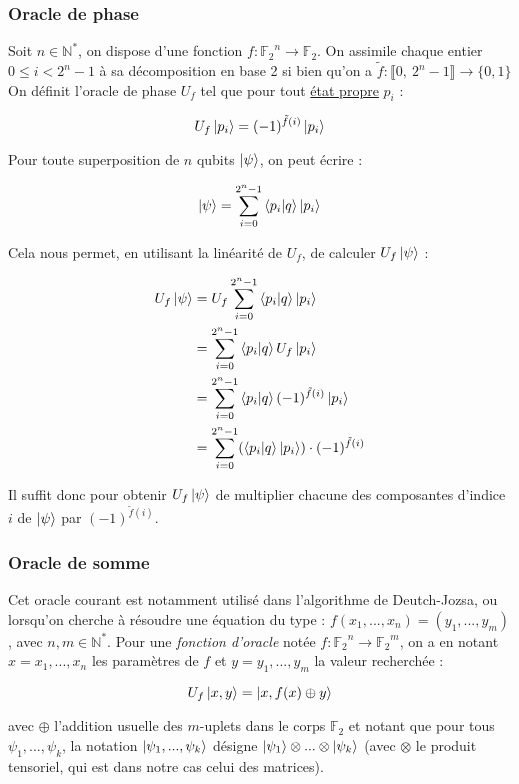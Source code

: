 \documentclass[french]{article}
\newcommand{\somme}{\displaystyle\sum}
\newcommand{\entiers}[2]{\llbracket #1,\ #2\rrbracket} %
\begin{document}
\subsubsection{Oracle de phase}


Soit $n \in \mathbb{N}^*$, on dispose d'une fonction $f : {\mathbb{F}_2}^n \rightarrow \mathbb{F}_2$. On assimile chaque entier $0 \le i < 2^n - 1$ à sa décomposition en base 2 si bien qu'on a $\tilde{f} : \entiers{0}{2^n - 1} \rightarrow \{0, 1\}$ On définit l'oracle de phase $U_f$ tel que pour tout \underline{état propre} $p_i$ :

$$U_f \ket{p_i} = (-1)^{\tilde{f}(i)} \ket{p_i}$$

Pour toute superposition de $n$ qubits $\ket \psi$, on peut écrire :

$$\ket \psi = \somme^{2^n-1}_{i = 0} \bra{p_i}\ket{q} \ket{p_i}$$

Cela nous permet, en utilisant la linéarité de $U_f$, de calculer $U_f \ket \psi$ :

\begin{align*}
U_f \ket \psi &= U_f \somme^{2^n-1}_{i = 0} \bra{p_i}\ket{q} \ket{p_i} \\
              &= \somme^{2^n-1}_{i = 0} \bra{p_i}\ket{q} U_f \ket{p_i} \\
              &= \somme^{2^n-1}_{i = 0} \bra{p_i}\ket{q} (-1)^{\tilde{f}(i)} \ket{p_i} \\
              &= \somme^{2^n-1}_{i = 0} (\bra{p_i}\ket{q} \ket{p_i}) \cdot (-1)^{\tilde{f}(i)}
\end{align*}

Il suffit donc pour obtenir $U_f \ket \psi$ de multiplier chacune des composantes d'indice $i$ de $\ket \psi$ par $(-1)^{\tilde{f}(i)}$.


\subsubsection{Oracle de somme}


Cet oracle courant est notamment utilisé dans l'algorithme de Deutch-Jozsa, ou lorsqu'on cherche à résoudre une équation du type : $f(x_1, ..., x_n) = (y_1, ..., y_m)$, avec $n, m \in \mathbb{N}^*$. Pour une \textit{fonction d'oracle} notée $f : {\mathbb{F}_2} ^ n \rightarrow {\mathbb{F}_2} ^ m$, on a en notant $x = x_1, ..., x_n$ les paramètres de $f$ et $y = y_1, ..., y_m$ la valeur recherchée :

$$U_f \ket{x, y} = \ket{x, f(x) \oplus y}$$

avec $\oplus$ l'addition usuelle des $m$-uplets dans le corps $\mathbb{F}_2$ et notant que pour tous $\psi_1, ..., \psi_k$, la notation $\ket{\psi_1, ..., \psi_k}$ désigne $\ket{\psi_1} \otimes ... \otimes \ket{\psi_k}$ (avec $\otimes$ le produit tensoriel, qui est dans notre cas celui des matrices). \newline
\end{document}

